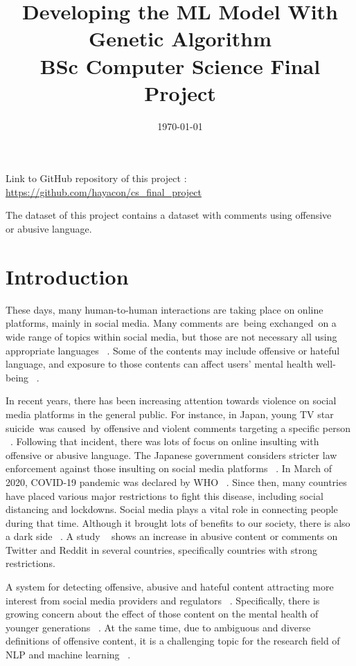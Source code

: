 \documentclass[11pt, natbib=false]{article}
\date{\today}
\title{%
  Developing the ML Model With Genetic Algorithm \\
  \large BSc Computer Science Final Project
}
\begin{document}
\maketitle
Link to GitHub repository of this project : \url{https://github.com/hayacon/cs_final_project}

The dataset of this project contains a dataset with comments using offensive \\ or abusive language.
\section{Introduction}
These days, many human-to-human interactions are taking place on online platforms, mainly in social media.
Many comments are being exchanged on a wide range of topics within social media, but those are not necessary all using appropriate languages ~\cite{hada2021ruddit}.
Some of the contents may include offensive or hateful language, and exposure to those contents can affect users’ mental health well-being ~\cite{hada2021ruddit}.

In recent years, there has been increasing attention towards violence on social media platforms in the general public.
For instance, in Japan, young TV star suicide was caused by offensive and violent comments targeting a specific person ~\cite{HanaK}.
Following that incident, there was lots of focus on online insulting with offensive or abusive language. The Japanese government considers stricter law enforcement against those insulting on social media platforms ~\cite{JpGov}.
In March of 2020, COVID-19 pandemic was declared by WHO ~\cite{whoCovid}.
Since then, many countries have placed various major restrictions to fight this disease, including social distancing and lockdowns. Social media plays a vital role in connecting people during that time. Although it brought lots of benefits to our society, there is also a dark side ~\cite{liu2021covid}.
A study ~\cite{babvey2021using} shows an increase in abusive content or comments on Twitter and Reddit in several countries, specifically countries with strong restrictions.

A system for detecting offensive, abusive and hateful content attracting more interest from social media providers and regulators ~\cite{vidgen2019challenges}.
Specifically, there is growing concern about the effect of those content on the mental health of younger generations ~\cite{babvey2021using}.
At the same time, due to ambiguous and diverse definitions of offensive content, it is a challenging topic for the research field of NLP and machine learning ~\cite{vidgen2019challenges}.
\end{document}
